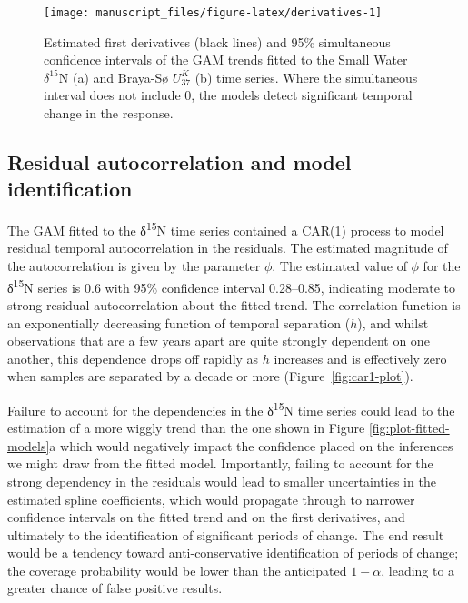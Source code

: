 \documentclass[12pt,]{article}
\newcommand{\uk}{\ensuremath{\mathit{U}^{\mathit{K}}_{\mathup{37}}}}
\begin{document}
\begin{figure}

{\centering \texttt{[image: manuscript\_files/figure-latex/derivatives-1]} 

}

\caption{Estimated first derivatives (black lines) and 95\% simultaneous confidence intervals of the GAM trends fitted to the Small Water $\delta^{15}\text{N}$ (a) and Braya-Sø \uk{} (b) time series. Where the simultaneous interval does not include 0, the models detect significant temporal change in the response.}\label{fig:derivatives}
\end{figure}

\hypertarget{identifiability}{\subsection{Residual autocorrelation and
model identification}\label{identifiability}}

The GAM fitted to the δ\textsuperscript{15}N time series contained a
CAR(1) process to model residual temporal autocorrelation in the
residuals. The estimated magnitude of the autocorrelation is given by
the parameter \(\phi\). The estimated value of \(\phi\) for the
δ\textsuperscript{15}N series is 0.6 with 95\% confidence interval
0.28--0.85, indicating moderate to strong residual autocorrelation about
the fitted trend. The correlation function is an exponentially
decreasing function of temporal separation (\(h\)), and whilst
observations that are a few years apart are quite strongly dependent on
one another, this dependence drops off rapidly as \(h\) increases and is
effectively zero when samples are separated by a decade or more
(Figure~\ref{fig:car1-plot}).

Failure to account for the dependencies in the δ\textsuperscript{15}N
time series could lead to the estimation of a more wiggly trend than the
one shown in Figure \ref{fig:plot-fitted-models}a which would negatively
impact the confidence placed on the inferences we might draw from the
fitted model. Importantly, failing to account for the strong dependency
in the residuals would lead to smaller uncertainties in the estimated
spline coefficients, which would propagate through to narrower
confidence intervals on the fitted trend and on the first derivatives,
and ultimately to the identification of significant periods of change.
The end result would be a tendency toward anti-conservative
identification of periods of change; the coverage probability would be
lower than the anticipated \(1 - \alpha\), leading to a greater chance
of false positive results.
\end{document}
